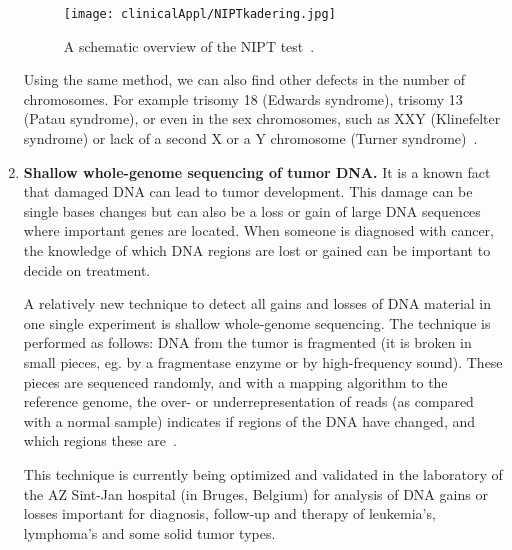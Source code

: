 \begin{enumerate}
	\begin{figure}[H]
		\centering
		\texttt{[image: clinicalAppl/NIPTkadering.jpg]}
		\caption{A schematic overview of the NIPT test~\cite{NIPT}.}
		\label{fig:NIPT}
	\end{figure}
	
	Using the same method, we can also find other defects in the number of chromosomes. For example trisomy 18 (Edwards syndrome), trisomy 13 (Patau syndrome), or even in the sex chromosomes, such as XXY (Klinefelter syndrome) or lack of a second X or a Y chromosome (Turner syndrome)~\cite{NIPT}.
	
	\item \textbf{Shallow whole-genome sequencing of tumor DNA.}\newline
	It is a known fact that damaged DNA can lead to tumor development. This damage can be single bases changes but can also be a loss or gain of large DNA sequences where important genes are located. When someone is diagnosed with cancer, the knowledge of which DNA regions are lost or gained can be important to decide on treatment. 
	
	A relatively new technique to detect all gains and losses of DNA material in one single experiment is shallow whole-genome sequencing. The technique is performed as follows: DNA from the tumor is fragmented (it is broken in small pieces, eg. by a fragmentase enzyme or by high-frequency sound). These pieces are sequenced randomly, and with a mapping algorithm to the reference genome, the over- or underrepresentation of reads (as compared with a normal sample) indicates if regions of the DNA have changed, and which regions these are~\cite{SWG}.
	
	This technique is currently being optimized and validated in the laboratory of the AZ Sint-Jan hospital (in Bruges, Belgium) for analysis of DNA gains or losses important for diagnosis, follow-up and therapy of leukemia's, lymphoma's and some solid tumor types.
\end{enumerate}